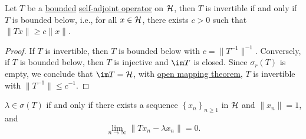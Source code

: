 \begin{lemma}\label{lma:invertibility-criterion}
	Let \(T\) be a \hyperref[rmk:bounded-op]{bounded} \hyperref[def:self-adjoint-op]{self-adjoint operator} on \(\mathcal{\MakeUppercase{h}} \), then \(T\) is invertible if and only if \(T\) is bounded below, i.e., for all \(x\in \mathcal{\MakeUppercase{h}} \), there exists \(c>0\) such that \(\lVert Tx \rVert \geq c\lVert x \rVert \).
\end{lemma}
\begin{proof}
	If \(T\) is invertible, then \(T\) is bounded below with \(c = \lVert T^{-1}  \rVert ^{-1} \). Conversely, if \(T\) is bounded below, then \(T\) is injective and \(\im T\) is closed. Since \(\sigma _r(T)\) is empty, we conclude that \(\im T=\mathcal{\MakeUppercase{h}} \), with \hyperref[thm:open-mapping]{open mapping theorem}, \(T\) is invertible with \(\lVert T^{-1}  \rVert \leq c^{-1} \).
\end{proof}

\begin{remark}
	\(\lambda \in \sigma (T)\) if and only if there exists a sequence \(\left\{ x_n \right\} _{n\geq 1}\) in \(\mathcal{\MakeUppercase{h}} \) and \(\lVert x_n \rVert = 1\), and
	\[
		\lim_{n \to \infty} \lVert Tx_n - \lambda x_n \rVert = 0.
	\]
\end{remark}

